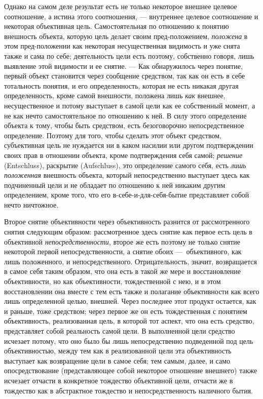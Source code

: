 \documentclass[twoside]{article}
\begin{document}
{{{{Однако на самом деле результат есть не только некоторое
внешнее целевое соотношение, а истина этого соотношения, —
внутреннее целевое соотношение и некоторая объективная цель.
Самостоятельная по отношению к понятию внешность объекта, которую цель
делает своим пред-положением,
{\em положена} в этом
пред-положении как некоторая несущественная видимость и уже
снята также и сама по себе; деятельность цели есть поэтому, собственно
говоря, лишь выявление этой видимости и ее снятие. — Как
обнаружилось через понятие, первый объект становится через сообщение
средством, так как он есть в себе тотальность понятия, и его
определенность, которая не есть никакая другая определенность, кроме самой
внешности, положена лишь {\em как}
внешнее, несущественное и потому выступает в самой цели как
ее собственный момент, а не как нечто самостоятельное по отношению к ней. В
силу этого определение объекта к тому, чтобы быть средством, есть
безоговорочно непосредственное определение. Поэтому для того, чтобы сделать
этот объект средством, субъективная цель не нуждается ни в каком насилии
или другом подтверждении своих прав в отношении объекта, кроме
подтверждения себя самой; {\em решение}
(Entschluss), раскрытие (Aufschluss), это
определение самого себя, есть {\em лишь
положенная} внешность объекта, который непосредственно
выступает здесь как подчиненный цели и не обладает по отношению к ней
никаким другим определением, кроме того, что его
в-себе-и-для-себя-бытие представляет собой нечто ничтожное.

Второе снятие объективности через объективность разнится от
рассмотренного снятия следующим образом: рассмотренное здесь снятие как
первое есть цель в объективной
{\em непосредственности},
второе же есть поэтому не только снятие некоторой первой
непосредственности, а снятие обоих —~объективного, как лишь
положенного, и непосредственного. Отрицательность, значит, возвращается в
самое себя таким образом, что она есть в такой же мере и восстановление
объективности, но как объективности, тождественной с нею, и в этом
восстановлении она вместе с тем есть также и полагание объективности как
всего лишь определенной целью, внешней. Через последнее этот продукт
остается, как и раньше, тоже средством; через первое же он есть
тождественная с понятием объективность, реализованная цель, в которой тот
аспект, что она есть средство, представляет собой реальность самой цели. В
выполненной цели средство исчезает потому, что оно было бы лишь
непосредственно подведенной под цель объективностью, между тем как в
реализованной цели эта объективность выступает как возвращение цели в самое
себя; тем самым, далее, и само опосредствование (представляющее собой
некоторое отношение внешнего) также исчезает отчасти в конкретное тождество
объективной цели, отчасти же в тождество как в абстрактное тождество и
непосредственность наличного бытия.

}}}}
\end{document}
